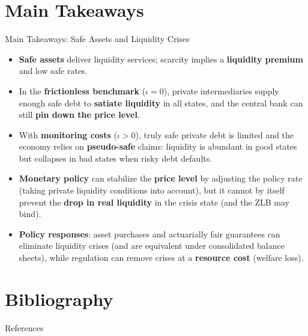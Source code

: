 \documentclass[11pt,aspectratio=169]{beamer}
\begin{document}
\section{Main Takeaways}
\begin{frame}{Main Takeaways: Safe Assets and Liquidity Crises}
\small
\begin{itemize}
  \item \textbf{Safe assets} deliver liquidity services; scarcity implies a \textbf{liquidity premium} and low safe rates.
  \item In the \textbf{frictionless benchmark} ($\iota=0$), private intermediaries supply enough safe debt to \textbf{satiate liquidity} in all states, and the central bank can still \textbf{pin down the price level}.
  \item With \textbf{monitoring costs} ($\iota>0$), truly safe private debt is limited and the economy relies on \textbf{pseudo-safe} claims:
  liquidity is abundant in good states but collapses in bad states when risky debt defaults.
  \item \textbf{Monetary policy} can stabilize the \textbf{price level} by adjusting the policy rate (taking private liquidity conditions into account), but it cannot by itself prevent the \textbf{drop in real liquidity} in the crisis state (and the ZLB may bind).
  \item \textbf{Policy responses}: asset purchases and actuarially fair guarantees can eliminate liquidity crises (and are equivalent under consolidated balance sheets), while regulation can remove crises at a \textbf{resource cost} (welfare loss).
\end{itemize}
\end{frame}


\section{Bibliography}
\begin{frame}[allowframebreaks]{References}
    \printbibliography %
\end{frame}
\end{document}
